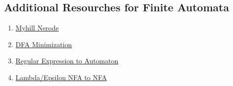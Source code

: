 \documentclass{article}
\begin{document}


\subsection*{Additional Resourches for Finite Automata}
\begin{enumerate}
    \item \href{https://www.youtube.com/watch?v=gjDPTy6fwbk}{Myhill Nerode}
    \item \href{https://www.youtube.com/watch?v=7W2lSrt8r-0&t=703s}{DFA Minimization}
    \item \href{https://www.youtube.com/watch?v=VbR1mGdP99s}{Regular Expression to Automaton}
    \item \href{https://www.youtube.com/watch?v=yXLZ9JbvEEg}{Lambda/Epsilon NFA to NFA}
\end{enumerate}
\newpage
\end{document}
